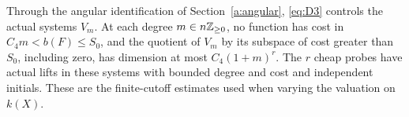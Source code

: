 Through the angular identification of Section~\ref{a:angular},
\eqref{eq:D3} controls the actual systems \(V_m\). At each degree
\(m\in n\mathbb Z_{\ge0}\), no function has cost in
\(C_4m<b(F)\le S_0\), and the quotient of \(V_m\) by its subspace
of cost greater than \(S_0\), including zero, has dimension at most
\(C_4(1+m)^r\). The \(r\) cheap probes have actual lifts in these
systems with bounded degree and cost and independent initials. These
are the finite-cutoff estimates used when varying the valuation on
\(k(X)\).
